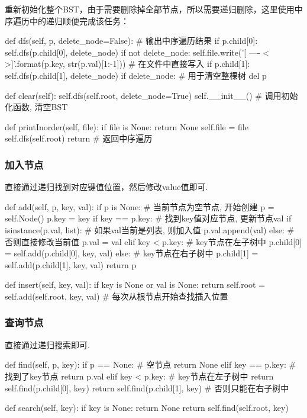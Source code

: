 \documentclass[12pt, a4paper, oneside]{ctexart}
\numberwithin{equation}{section}  %
\begin{document}
重新初始化整个BST，由于需要删除掉全部节点，所以需要递归删除，这里使用中序遍历中的递归顺便完成该任务：
\begin{pythoncode}
def dfs(self, p, delete_node=False):  # 输出中序遍历结果
    if p.child[0]:
        self.dfs(p.child[0], delete_node)
    if not delete_node:
        self.file.write('[{} ---- < {} >]\n'.format(p.key, str(p.val)[1:-1]))  # 在文件中直接写入
    if p.child[1]:
        self.dfs(p.child[1], delete_node)
    if delete_node:  # 用于清空整棵树
        del p

def clear(self):
    self.dfs(self.root, delete_node=True)
    self.__init__()  # 调用初始化函数, 清空BST

def printInorder(self, file):
    if file is None:
        return None
    self.file = file
    self.dfs(self.root)
    return   # 返回中序遍历
\end{pythoncode}

\subsubsection{加入节点}
直接通过递归找到对应键值位置，然后修改value值即可.
\begin{pythoncode}
def add(self, p, key, val):
    if p is None:  # 当前节点为空节点, 开始创建
        p = self.Node()
        p.key = key
    if key == p.key:  # 找到key值对应节点, 更新节点val
        if isinstance(p.val, list):  # 如果val当前是列表, 则加入值
            p.val.append(val)
        else:  # 否则直接修改当前值
            p.val = val
    elif key < p.key:  # key节点在左子树中
        p.child[0] = self.add(p.child[0], key, val)
    else:  # key节点在右子树中
        p.child[1] = self.add(p.child[1], key, val)
    return p

def insert(self, key, val):
    if key is None or val is None:
        return
    self.root = self.add(self.root, key, val)  # 每次从根节点开始查找插入位置
\end{pythoncode}

\subsubsection{查询节点}
直接通过递归搜索即可.
\begin{pythoncode}
def find(self, p, key):
    if p == None:  # 空节点
        return None
    elif key == p.key:  # 找到了key节点
        return p.val
    elif key < p.key:  # key节点在左子树中
        return self.find(p.child[0], key)
    return self.find(p.child[1], key)  # 否则只能在右子树中

def search(self, key):
    if key is None:
        return None
    return self.find(self.root, key)
\end{pythoncode}
\end{document}
